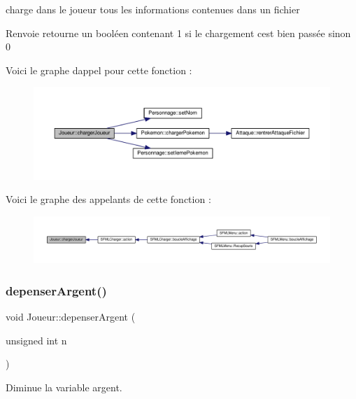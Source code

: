 charge dans le joueur tous les informations contenues dans un fichier 

\begin{DoxyReturn}{Renvoie}
retourne un booléen contenant 1 si le chargement c\textquotesingle{}est bien passée sinon 0 
\end{DoxyReturn}
Voici le graphe d\textquotesingle{}appel pour cette fonction \+:\nopagebreak
\begin{figure}[H]
\begin{center}
\leavevmode
\includegraphics[width=350pt]{class_joueur_a2bf2a581a2e4de27a812e21b360ab9f3_cgraph}
\end{center}
\end{figure}
Voici le graphe des appelants de cette fonction \+:\nopagebreak
\begin{figure}[H]
\begin{center}
\leavevmode
\includegraphics[width=350pt]{class_joueur_a2bf2a581a2e4de27a812e21b360ab9f3_icgraph}
\end{center}
\end{figure}
\mbox{\label{class_joueur_ae496646b2078c86011fa200b631168ca}} 
\subsubsection{\texorpdfstring{depenser\+Argent()}{depenserArgent()}}
{\footnotesize\ttfamily void Joueur\+::depenser\+Argent (\begin{DoxyParamCaption}\item[{unsigned int}]{n }\end{DoxyParamCaption})}



Diminue la variable argent. 


